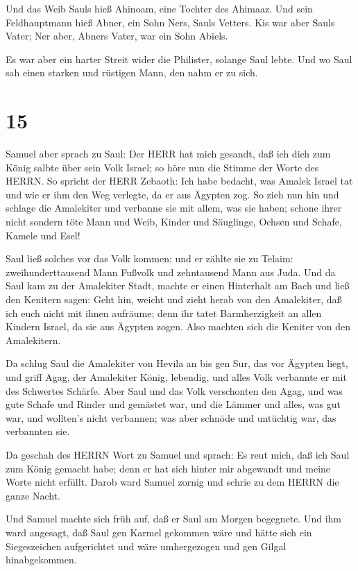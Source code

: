  Und das Weib Sauls hieß Ahinoam, eine Tochter des Ahimaaz.
Und sein Feldhauptmann hieß Abner, ein Sohn Ners, Sauls Vetters.
 Kis war aber Sauls Vater; Ner aber, Abners Vater, war ein
Sohn Abiels.

 Es war aber ein harter Streit wider die Philister, solange
Saul lebte. Und wo Saul sah einen starken und rüstigen Mann, den nahm er
zu sich.

\hypertarget{section-14}{%
\section{15}\label{section-14}}

 Samuel aber sprach zu Saul: Der HERR hat mich gesandt, daß
ich dich zum König salbte über sein Volk Israel; so höre nun die Stimme
der Worte des HERRN.  So spricht der HERR Zebaoth: Ich habe
bedacht, was Amalek Israel tat und wie er ihm den Weg verlegte, da er
aus Ägypten zog.  So zieh nun hin und schlage die Amalekiter
und verbanne sie mit allem, was sie haben; schone ihrer nicht sondern
töte Mann und Weib, Kinder und Säuglinge, Ochsen und Schafe, Kamele und
Esel!

 Saul ließ solches vor das Volk kommen; und er zählte sie zu
Telaim: zweihunderttausend Mann Fußvolk und zehntausend Mann aus Juda.
 Und da Saul kam zu der Amalekiter Stadt, machte er einen
Hinterhalt am Bach  und ließ den Kenitern sagen: Geht hin,
weicht und zieht herab von den Amalekiter, daß ich euch nicht mit ihnen
aufräume; denn ihr tatet Barmherzigkeit an allen Kindern Israel, da sie
aus Ägypten zogen. Also machten sich die Keniter von den Amalekitern.

 Da schlug Saul die Amalekiter von Hevila an bis gen Sur,
das vor Ägypten liegt,  und griff Agag, der Amalekiter
König, lebendig, und alles Volk verbannte er mit des Schwertes Schärfe.
 Aber Saul und das Volk verschonten den Agag, und was gute
Schafe und Rinder und gemästet war, und die Lämmer und alles, was gut
war, und wollten's nicht verbannen; was aber schnöde und untüchtig war,
das verbannten sie.

 Da geschah des HERRN Wort zu Samuel und sprach:
 Es reut mich, daß ich Saul zum König gemacht habe; denn er
hat sich hinter mir abgewandt und meine Worte nicht erfüllt. Darob ward
Samuel zornig und schrie zu dem HERRN die ganze Nacht.

 Und Samuel machte sich früh auf, daß er Saul am Morgen
begegnete. Und ihm ward angesagt, daß Saul gen Karmel gekommen wäre und
hätte sich ein Siegeszeichen aufgerichtet und wäre umhergezogen und gen
Gilgal hinabgekommen.

